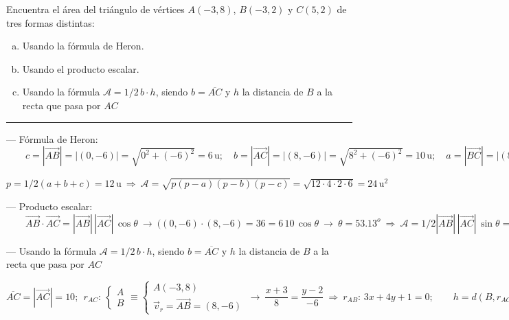 \begin{miejercicio}

Encuentra el área del triángulo de vértices $A(-3,8)$, $B(-3,2)$ y $C(5,2)$ de tres formas distintas:

\begin{enumerate}[a) ]
\item Usando la fórmula de Heron.
\item Usando el producto escalar.
\item Usando la fórmula $\mathcal A=1/2 \, b\cdot h$, siendo $b=\overline{AC}$ y $h$ la distancia de $B$ a la recta que pasa por $AC$
\end{enumerate}


\rule{250pt}{0.1pt}

\vspace{2mm} --- Fórmula de Heron: $\qquad c=|\overrightarrow{AB}|=|(0,-6)|=\sqrt{0^2+(-6)^2}=6\, \mathrm{u};\quad b=|\overrightarrow{AC}|=|(8,-6)|=\sqrt{8^2+(-6)^2}=10\, \mathrm{u}; \quad a=|\overrightarrow{BC}|=|(8,0)|=\sqrt{8^2+0^2}=8\, \mathrm{u}$	

\vspace{2mm} $p=1/2(a+b+c)=12\, \mathrm{u} \ \Rightarrow \ \mathcal A=\sqrt{p(p-a)(p-b)(p-c)}=\sqrt{12\cdot 4\cdot 2\cdot 6}=24 \, \mathrm{u}^2$ 

\vspace{5mm} --- Producto escalar: $\qquad \overrightarrow{AB}\cdot \overrightarrow{AC}=|\overrightarrow{AB}|\, |\overrightarrow{AC}|\, \cos \theta \ \to \ ((0,-6)\cdot (8,-6)=36=6\, 10\, \cos \theta \ \to \ \theta=53.13^o \ \Rightarrow \ \mathcal A=1/2 |\overrightarrow{AB}|\, |\overrightarrow{AC}|\, \sin \theta =24\, \mathrm{u}^2$

\vspace{5mm} --- Usando la fórmula $\mathcal A=1/2 \, b\cdot h$, siendo $b=\overline{AC}$ y $h$ la distancia de $B$ a la recta que pasa por $AC$

\vspace{2mm} $\overline{AC}=|\overrightarrow{AC}|=10;\ \ r_{AC}:\,\begin{cases} A \\ B \end{cases} \equiv \begin{cases} A(-3,8) \\ \vec v_r=\overrightarrow{AB}=(8,-6) \end{cases} \ \to \ \dfrac{x+3}{8}=\dfrac{y-2}{-6} \ \Rightarrow \ r_{AB}:\, 3x+4y+1=0;\qquad h=d(B,r_{AC})=	\dfrac{| 3(-3) +4(8)+1|}{\sqrt{3^2+4^2}}=\dfrac{24}{5}\, \mathrm{u} \ \ \Rightarrow \ \ \mathcal A=1/2 \, 10\,  \dfrac{24}{5}=24 \, \mathrm{u}^2$
\end{miejercicio}

